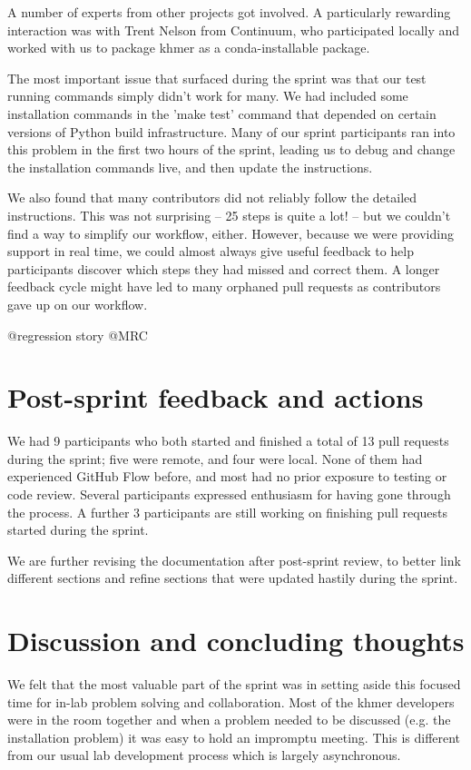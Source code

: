 \documentclass[12pt]{article}
\begin{document}
A number of experts from other projects got involved.  A particularly
rewarding interaction was with Trent Nelson from Continuum, who participated
locally and worked with us to package khmer as a conda-installable package.

The most important issue that surfaced during the sprint was that our
test running commands simply didn't work for many.  We had included
some installation commands in the 'make test' command that depended on
certain versions of Python build infrastructure.  Many of our sprint
participants ran into this problem in the first two hours of the
sprint, leading us to debug and change the installation commands live,
and then update the instructions.

We also found that many contributors did not reliably follow the
detailed instructions.  This was not surprising -- 25 steps is quite a
lot! -- but we couldn't find a way to simplify our workflow, either.
However, because we were providing support in real time, we could
almost always give useful feedback to help participants discover which
steps they had missed and correct them.  A longer feedback cycle might
have led to many orphaned pull requests as contributors gave up on our
workflow.

@regression story @MRC

\section{Post-sprint feedback and actions}

We had 9 participants who both started and finished a total of 13 pull
requests during the sprint; five were remote, and four were
local. None of them had experienced GitHub Flow before, and most had
no prior exposure to testing or code review.  Several participants
expressed enthusiasm for having gone through the process.
A further 3 participants are still working on finishing pull requests
started during the sprint.

We are further revising the documentation after post-sprint review, to
better link different sections and refine sections that were updated
hastily during the sprint.

\section{Discussion and concluding thoughts}

We felt that the most valuable part of the sprint was in setting aside
this focused time for in-lab problem solving and collaboration.  Most of
the khmer developers were in the room together and when a problem
needed to be discussed (e.g. the installation problem) it was easy to
hold an impromptu meeting.  This is different from our usual lab
development process which is largely asynchronous.
\end{document}
